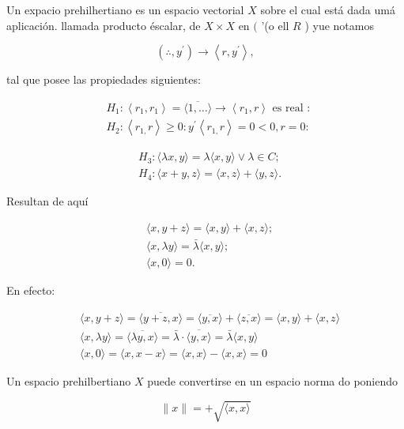 \documentclass[10pt]{article}
\theoremstyle{plain}
\theoremstyle{definition}
\theoremstyle{remark}
\begin{document}
Un expacio prehilhertiano es un espacio vectorial $X$ sobre el cual está dada umá aplicación. llamada producto éscalar, de $X \times X$ en $($ ’(o ell $R$ ) yue notamos

$$
\left(\therefore, y^{\prime}\right) \rightarrow\left\langle r, y^{\prime}\right\rangle,
$$

tal que posee las propiedades siguientes:

$$
\begin{aligned}
& H_{1}:\left\langle r_{1}, r_{1}\right\rangle=\langle\overline{1, \ldots}\rangle \rightarrow\left\langle r_{1}, r\right\rangle \text { es real : } \\
& H_{2}:\left\langle r_{1,} r\right\rangle \geqslant 0: y^{\prime}\left\langle r_{1,} r\right\rangle=0<0, r=0:
\end{aligned}
$$

$$
\begin{aligned}
& H_{3}:\langle\lambda x, y\rangle=\lambda\langle x, y\rangle \vee \lambda \in C ; \\
& H_{4}:\langle x+y, z\rangle=\langle x, z\rangle+\langle y, z\rangle .
\end{aligned}
$$

Resultan de aquí


\begin{align*}
& \langle x, y+z\rangle=\langle x, y\rangle+\langle x, z\rangle ;  \tag{3-1}\\
& \langle x, \lambda y\rangle=\bar{\lambda}\langle x, y\rangle ;  \tag{3-2}\\
& \langle x, 0\rangle=0 . \tag{$3\cdot3$}
\end{align*}


En efecto:

$$
\begin{aligned}
& \langle x, y+z\rangle=\langle\overline{y+z, x}\rangle=\langle\overline{y, x}\rangle+\langle\overline{z, x}\rangle=\langle x, y\rangle+\langle x, z\rangle \\
& \langle x, \lambda y\rangle=\langle\overline{\lambda y, x}\rangle=\bar{\lambda} \cdot \overline{\langle y, x\rangle}=\bar{\lambda}\langle x, y\rangle \\
& \langle x, 0\rangle=\langle x, x-x\rangle=\langle x, x\rangle-\langle x, x\rangle=0
\end{aligned}
$$

Un espacio prehilbertiano $X$ puede convertirse en un espacio norma do poniendo


\begin{equation*}
\|x\|=+\sqrt{\langle x, x\rangle} \tag{3-4}
\end{equation*}
\end{document}
